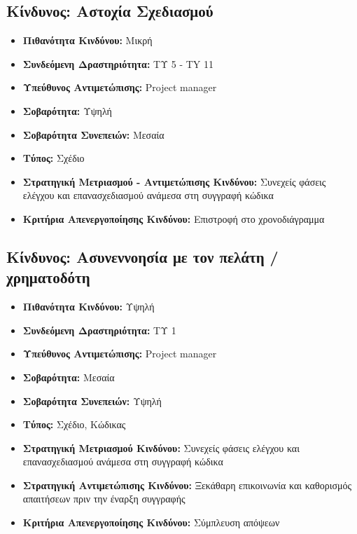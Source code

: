 \documentclass[12pt,a4paper]{article}
\begin{document}
\subsection{Κίνδυνος: Αστοχία Σχεδιασμού}
\begin{itemize}
	\item \textbf{Πιθανότητα Κινδύνου:} Μικρή
	\item \textbf{Συνδεόμενη Δραστηριότητα:} ΤΥ 5 - TY 11
	\item \textbf{Υπεύθυνος Αντιμετώπισης:} Project manager
	\item \textbf{Σοβαρότητα:} Υψηλή
	\item \textbf{Σοβαρότητα Συνεπειών:} Μεσαία
	\item \textbf{Τύπος:} Σχέδιο
	\item \textbf{Στρατηγική Μετριασμού - Αντιμετώπισης Κινδύνου:} Συνεχείς φάσεις ελέγχου και επανασχεδιασμού ανάμεσα στη συγγραφή κώδικα 
	\item \textbf{Κριτήρια Απενεργοποίησης Κινδύνου:} Επιστροφή στο χρονοδιάγραμμα
\end{itemize}

\subsection{Κίνδυνος: Ασυνεννοησία με τον πελάτη / χρηματοδότη}
\begin{itemize}
	\item \textbf{Πιθανότητα Κινδύνου:} Υψηλή
	\item \textbf{Συνδεόμενη Δραστηριότητα:} ΤΥ 1
	\item \textbf{Υπεύθυνος Αντιμετώπισης:} Project manager
	\item \textbf{Σοβαρότητα:} Μεσαία
	\item \textbf{Σοβαρότητα Συνεπειών:} Υψηλή
	\item \textbf{Τύπος:} Σχέδιο, Κώδικας
	\item \textbf{Στρατηγική Μετριασμού Κινδύνου:} Συνεχείς φάσεις ελέγχου και επανασχεδιασμού ανάμεσα στη συγγραφή κώδικα
	\item \textbf{Στρατηγική Αντιμετώπισης Κινδύνου:} Ξεκάθαρη επικοινωνία και καθορισμός απαιτήσεων πριν την έναρξη συγγραφής
	\item \textbf{Κριτήρια Απενεργοποίησης Κινδύνου:} Σύμπλευση απόψεων
\end{itemize}
\end{document}

